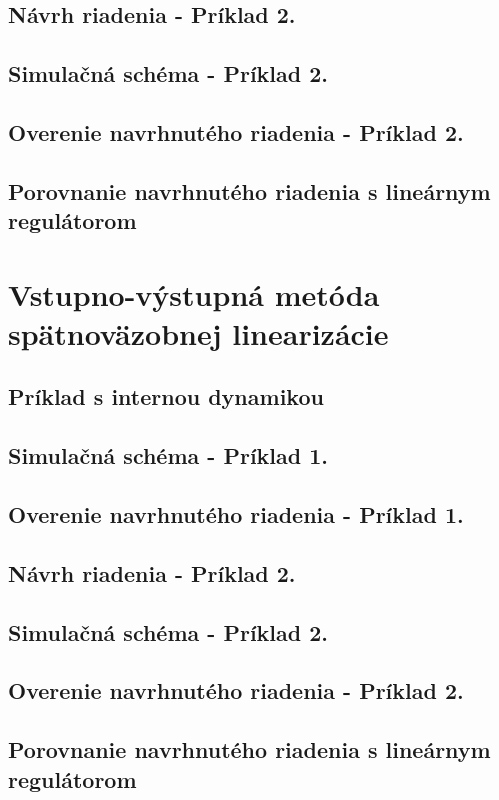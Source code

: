 \subsection{Návrh riadenia - Príklad 2.}
\subsection{Simulačná schéma - Príklad 2.}
\subsection{Overenie navrhnutého riadenia - Príklad 2.}
\subsection{Porovnanie navrhnutého riadenia s lineárnym regulátorom}

\newpage
\section{Vstupno-výstupná metóda spätnoväzobnej linearizácie}
	

\subsection{Príklad s internou dynamikou}
 


\subsection{Simulačná schéma - Príklad 1.}
\subsection{Overenie navrhnutého riadenia - Príklad 1.}
\subsection{Návrh riadenia - Príklad 2.}
\subsection{Simulačná schéma - Príklad 2.}
\subsection{Overenie navrhnutého riadenia - Príklad 2.}
\subsection{Porovnanie navrhnutého riadenia s lineárnym regulátorom}



